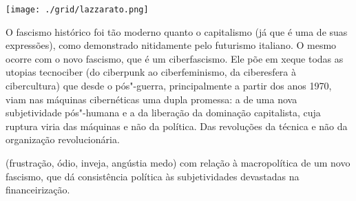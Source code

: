 \hspace*{-.4cm}\begin{minipage}[c]{.8\linewidth}
\small{
{}}
\end{minipage}

\pagebreak %


\begin{center}
\hspace*{.5cm}\texttt{[image: ./grid/lazzarato.png]}
\end{center}

\hspace*{-7cm}\hrulefill\hspace*{-7cm}

\medskip

\noindent{}O fascismo histórico foi tão moderno quanto o capitalismo (já que é uma de suas expressões), como demonstrado nitidamente pelo futurismo italiano. O mesmo ocorre com o novo fascismo, que é um ciberfascismo. Ele põe em xeque todas as utopias tecnociber (do ciberpunk ao ciberfeminismo, da ciberesfera à cibercultura) que desde o pós"-guerra, principalmente a partir dos anos 1970, viam nas máquinas cibernéticas uma dupla promessa: a de uma nova subjetividade pós"-humana e a da liberação da dominação capitalista, cuja ruptura viria das máquinas e não da política. Das revoluções da técnica e não da organização revolucionária.

 (frustração, ódio, inveja, angústia medo) com relação à macropolítica de um novo fascismo, que dá consistência política às subjetividades devastadas na financeirização.

\vfill

\hspace*{-.4cm}\begin{minipage}[c]{.5\linewidth}
\small{
{}}
\end{minipage}

